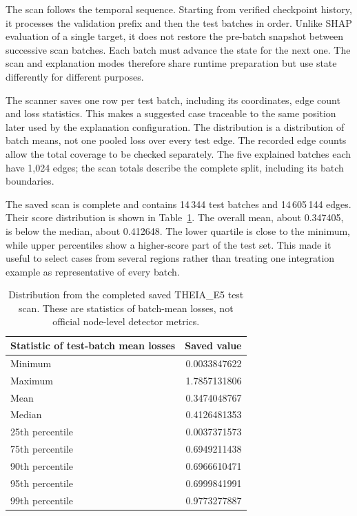 \documentclass[11pt,a4paper]{article}
\newcommand{\ScanBatches}{14\,344}
\newcommand{\ScanEdges}{14\,605\,144}
\begin{document}
The scan follows the temporal sequence. Starting from verified checkpoint
history, it processes the validation prefix and then the test batches in order.
Unlike SHAP evaluation of a single target, it does not restore the pre-batch
snapshot between successive scan batches. Each batch must advance the state
for the next one. The scan and explanation modes therefore share runtime
preparation but use state differently for different purposes.

The scanner saves one row per test batch, including its coordinates, edge
count and loss statistics. This makes a suggested case traceable to the same
position later used by the explanation configuration. The distribution is a
distribution of batch means, not one pooled loss over every test edge. The
recorded edge counts allow the total coverage to be checked separately. The
five explained batches each have 1,024 edges; the scan totals describe the
complete split, including its batch boundaries.

The saved scan is complete and contains \ScanBatches{} test batches and
\ScanEdges{} edges. Their score distribution is shown in Table~\ref{tab:scan}.
The overall mean, about 0.347405, is below the median, about 0.412648. The lower
quartile is close to the minimum, while upper percentiles show a higher-score
part of the test set. This made it useful to select cases from several regions
rather than treating one integration example as representative of every batch.

\begin{table}[htbp]
\centering
\begin{tabular}{lr}
\toprule
Statistic of test-batch mean losses & Saved value\\
\midrule
Minimum & 0.0033847622\\
Maximum & 1.7857131806\\
Mean & 0.3474048767\\
Median & 0.4126481353\\
25th percentile & 0.0037371573\\
75th percentile & 0.6949211438\\
90th percentile & 0.6966610471\\
95th percentile & 0.6999841991\\
99th percentile & 0.9773277887\\
\bottomrule
\end{tabular}
\caption{Distribution from the completed saved THEIA\_E5 test scan. These are
statistics of batch-mean losses, not official node-level detector metrics.}
\label{tab:scan}
\end{table}
\end{document}
